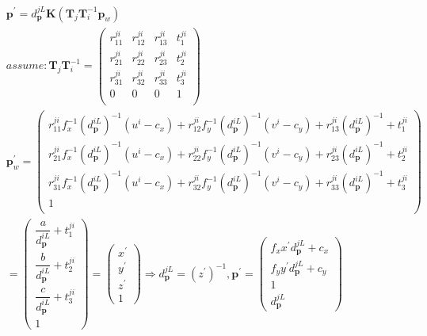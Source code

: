 \documentclass{article}
\begin{document}
\begin{CJK*}{GBK}{song}
\begin{equation}\left.\begin{aligned}
&
\textbf{p}^{'}=d_\textbf{p}^{jL}\textbf{K}(\textbf{T}_j\textbf{T}_i^{-1}\textbf{p}_w)
\\&
assume:
\textbf{T}_j\textbf{T}_i^{-1}=
\left(
  \begin{array}{cccc}
    r^{ji}_{11} & r^{ji}_{12} & r^{ji}_{13} & t^{ji}_{1} \\
    r^{ji}_{21} & r^{ji}_{22} & r^{ji}_{23} & t^{ji}_{2} \\
    r^{ji}_{31} & r^{ji}_{32} & r^{ji}_{33} & t^{ji}_{3} \\
    0 & 0 & 0 & 1 \\
  \end{array}
\right)
\\&
\textbf{p}^{'}_w=
\left(
  \begin{array}{cccc}
    r^{ji}_{11}f_x^{-1}(d_\textbf{p}^{iL})^{-1}(u^i-c_x) + r^{ji}_{12}f_y^{-1}(d_\textbf{p}^{iL})^{-1}(v^i-c_y)  +
    r^{ji}_{13}(d_\textbf{p}^{iL})^{-1} + t^{ji}_{1} \\
    r^{ji}_{21}f_x^{-1}(d_\textbf{p}^{iL})^{-1}(u^i-c_x) + r^{ji}_{22}f_y^{-1}(d_\textbf{p}^{iL})^{-1}(v^i-c_y)
    + r^{ji}_{23}(d_\textbf{p}^{iL})^{-1} + t^{ji}_{2} \\
    r^{ji}_{31}f_x^{-1}(d_\textbf{p}^{iL})^{-1}(u^i-c_x)
    + r^{ji}_{32}f_y^{-1}(d_\textbf{p}^{iL})^{-1}(v^i-c_y)+
     r^{ji}_{33}(d_\textbf{p}^{iL})^{-1} + t^{ji}_{3} \\
     1 \\
  \end{array}
\right)
\\&=
\begin{pmatrix}\dfrac{a}{d_\textbf{p}^{iL}}+t^{ji}_{1}\\
               \dfrac{b}{d_\textbf{p}^{iL}}+t^{ji}_{2}\\
               \dfrac{c}{d_\textbf{p}^{iL}}+t^{ji}_{3}\\
               1
               \end{pmatrix}
=\begin{pmatrix}x^{'}\\y^{'}\\z^{'}\\1\end{pmatrix}
\Rightarrow d_\textbf{p}^{jL}=(z^{'})^{-1},
\textbf{p}^{'}=\begin{pmatrix}f_x{x^{'}}{d_\textbf{p}^{jL}}+c_x
\\f_y{y^{'}}{d_\textbf{p}^{jL}}+c_y
\\1\\d_\textbf{p}^{jL}\end{pmatrix}

\end{aligned}
\end{equation}
\end{CJK*}
\end{document}
